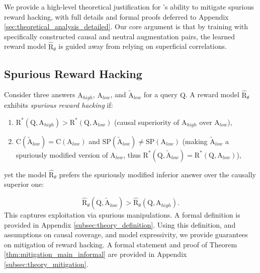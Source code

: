 
We provide a high-level theoretical justification for \carma{}'s ability to mitigate spurious reward hacking, with full details and formal proofs deferred to Appendix \ref{sec:theoretical_analysis_detailed}. Our core argument is that by training with specifically constructed causal and neutral augmentation pairs, the learned reward model $\hat{\mathrm{R}}_\theta$ is guided away from relying on superficial correlations.

\vspace{-0.05in}
\subsection{Spurious Reward Hacking}
Consider three answers $\mathrm{A}_{high}$, $\mathrm{A}_{low}$, and $\tilde{\mathrm{A}}_{low}$ for a query $\mathrm{Q}$.
A reward model $\hat{\mathrm{R}}_\theta$ exhibits \textit{spurious reward hacking} if:
\begin{enumerate}[label=(\roman*), itemsep=0pt, left=15pt, topsep=3pt]
    \item $\mathrm{R}^*(\mathrm{Q}, \mathrm{A}_{high}) > \mathrm{R}^*(\mathrm{Q}, \mathrm{A}_{low})$ (causal superiority of $\mathrm{A}_{high}$ over $\mathrm{A}_{low}$),
    \item $\mathrm{C}(\tilde{\mathrm{A}}_{low}) = \mathrm{C}(\mathrm{A}_{low})$ and $\mathrm{SP}(\tilde{\mathrm{A}}_{low}) \neq \mathrm{SP}(\mathrm{A}_{low})$ (making $\tilde{\mathrm{A}}_{low}$ a spuriously modified version of $\mathrm{A}_{low}$, thus $\mathrm{R}^*(\mathrm{Q}, \tilde{\mathrm{A}}_{low}) = \mathrm{R}^*(\mathrm{Q}, \mathrm{A}_{low})$),
\end{enumerate}
\vspace{-0.05in}
yet the model $\hat{\mathrm{R}}_\theta$ prefers the spuriously modified inferior answer over the causally superior one:

\vspace{-0.15in}
\begin{equation}
\hat{\mathrm{R}}_\theta(\mathrm{Q}, \tilde{\mathrm{A}}_{low}) > \hat{\mathrm{R}}_\theta(\mathrm{Q}, \mathrm{A}_{high}).
\label{eq:hacking_condition_main}
\end{equation}
This captures exploitation via spurious manipulations. A formal definition is provided in Appendix \ref{subsec:theory_definition}. Using this definition, and assumptions on causal coverage, and model expressivity, we provide guarantees on mitigation of reward hacking. A formal statement and proof of Theorem \ref{thm:mitigation_main_informal} are provided in Appendix \ref{subsec:theory_mitigation}.

